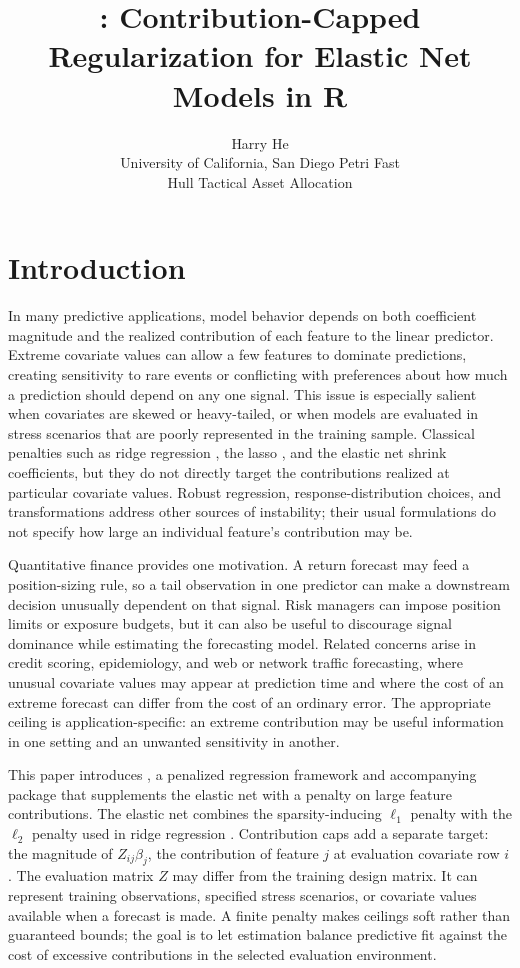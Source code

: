 \documentclass[article,shortnames,nofooter]{jss}
\title{\pkg{capnet}: Contribution-Capped Regularization for Elastic Net Models in R}
\author{Harry He\\University of California, San Diego
   \And Petri Fast\\ Hull Tactical Asset Allocation
   \\}
\begin{document}
\section{Introduction}

In many predictive applications, model behavior depends on both coefficient magnitude and the realized contribution of each feature to the linear predictor. Extreme covariate values can allow a few features to dominate predictions, creating sensitivity to rare events or conflicting with preferences about how much a prediction should depend on any one signal. This issue is especially salient when covariates are skewed or heavy-tailed, or when models are evaluated in stress scenarios that are poorly represented in the training sample. Classical penalties such as ridge regression \citep{hoerl1970}, the lasso \citep{tibshirani1996}, and the elastic net \citep{zou2005} shrink coefficients, but they do not directly target the contributions realized at particular covariate values. Robust regression, response-distribution choices, and transformations address other sources of instability; their usual formulations do not specify how large an individual feature's contribution may be.

Quantitative finance provides one motivation. A return forecast may feed a position-sizing rule, so a tail observation in one predictor can make a downstream decision unusually dependent on that signal. Risk managers can impose position limits or exposure budgets, but it can also be useful to discourage signal dominance while estimating the forecasting model. Related concerns arise in credit scoring, epidemiology, and web or network traffic forecasting, where unusual covariate values may appear at prediction time and where the cost of an extreme forecast can differ from the cost of an ordinary error. The appropriate ceiling is application-specific: an extreme contribution may be useful information in one setting and an unwanted sensitivity in another.

This paper introduces , a penalized regression framework and accompanying  package that supplements the elastic net with a penalty on large feature contributions. The elastic net combines the sparsity-inducing $\ell_1$ penalty with the $\ell_2$ penalty used in ridge regression \citep{zou2005}. Contribution caps add a separate target: the magnitude of $Z_{ij}\beta_j$, the contribution of feature $j$ at evaluation covariate row $i$. The evaluation matrix $Z$ may differ from the training design matrix. It can represent training observations, specified stress scenarios, or covariate values available when a forecast is made. A finite penalty makes ceilings soft rather than guaranteed bounds; the goal is to let estimation balance predictive fit against the cost of excessive contributions in the selected evaluation environment.
\end{document}
